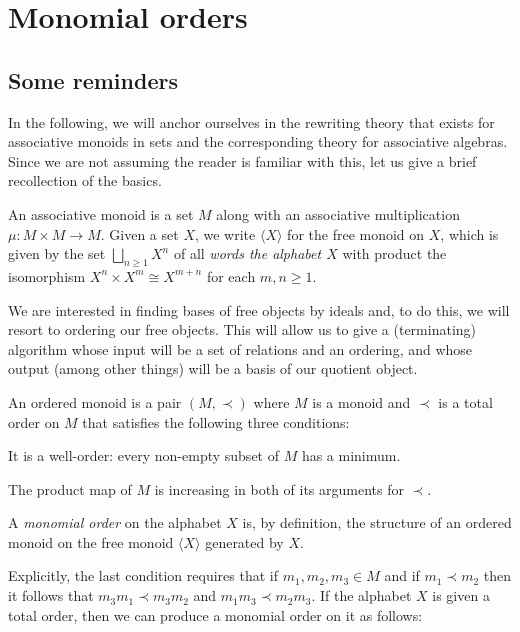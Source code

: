 \section{Monomial orders}


\subsection{Some reminders}

In the following, we will anchor ourselves in the 
rewriting theory that exists for associative monoids
in sets and the corresponding theory for
associative algebras. Since we are not assuming
the reader is familiar with this, let us give
a brief recollection of the basics.

\begin{definition}
An associative monoid is a set $M$ along with
an associative multiplication $\mu : M\times M
\longrightarrow M$. Given a set $X$, we write
$\langle X\rangle$ for the free monoid on 
$X$, which is given by the set
$
 \bigsqcup_{n\geqslant 1} X^{n}
 $
of all \emph{words the alphabet $X$} with
product the isomorphism
$ X^n\times X^m \cong X^{m+n}$
for each $m,n\geqslant 1$.
\end{definition}

We are interested in finding bases of 
free objects by ideals and, to do this,
we will resort to ordering our free objects.
This will allow us to give a (terminating)
algorithm whose input will be a set of 
relations and an ordering, and whose
output (among other things) will 
be a basis of our quotient object.

\begin{definition}

An ordered monoid is a pair $(M,\prec)$ where $M$ is a monoid
and $\prec$ is a total order on $M$ that satisfies the
following three conditions:
\begin{tenumerate}
\item It is a well-order: every non-empty subset of $M$
has a minimum. 
\item The product map of $M$ is increasing in both of its
arguments for $\prec$. 
\end{tenumerate}
A \emph{monomial order} on the alphabet $X$ is, by definition,
the structure of an ordered monoid on the free monoid $\langle X\rangle$
generated by $X$.
\end{definition}

Explicitly, the last condition requires that if $m_1,m_2,m_3\in M$
and if $m_1\prec m_2$ then it follows that $m_3m_1\prec m_3m_2$ 
and $m_1m_3\prec m_2m_3$. If the alphabet $X$ is given a total order, 
then we can produce a monomial order on it as follows:

